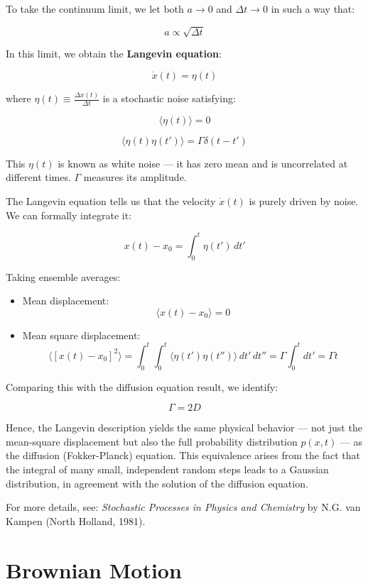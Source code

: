 \documentclass[
  letterpaper,
  enabledeprecatedfontcommands]{report}
\begin{document}
To take the continuum limit, we let both \(a \to 0\) and
\(\Delta t \to 0\) in such a way that:

\[
a \propto \sqrt{\Delta t}
\]

In this limit, we obtain the \textbf{Langevin equation}:

\[
\dot{x}(t) = \eta(t)
\]

where \(\eta(t)\equiv\frac{\Delta x(t)}{\Delta t}\) is a stochastic
noise satisfying:

\[
\langle \eta(t) \rangle = 0
\]

\[
\langle \eta(t) \eta(t') \rangle = \Gamma \delta(t - t')
\]

This \(\eta(t)\) is known as white noise --- it has zero mean and is
uncorrelated at different times. \(\Gamma\) measures its amplitude.

The Langevin equation tells us that the velocity \(\dot{x}(t)\) is
purely driven by noise. We can formally integrate it:

\[
x(t) - x_0 = \int_0^t \eta(t')\, dt'
\]

Taking ensemble averages:

\begin{itemize}
\item
  Mean displacement: \[
  \langle x(t) - x_0 \rangle = 0
  \]
\item
  Mean square displacement: \[
  \langle [x(t) - x_0]^2 \rangle = \int_0^t \int_0^t \langle \eta(t') \eta(t'') \rangle\, dt'\, dt'' = \Gamma \int_0^t dt' = \Gamma t
  \]
\end{itemize}

Comparing this with the diffusion equation result, we identify:

\[
\Gamma = 2D
\]

Hence, the Langevin description yields the same physical behavior ---
not just the mean-square displacement but also the full probability
distribution \(p(x, t)\) --- as the diffusion (Fokker-Planck) equation.
This equivalence arises from the fact that the integral of many small,
independent random steps leads to a Gaussian distribution, in agreement
with the solution of the diffusion equation.

For more details, see: \emph{Stochastic Processes in Physics and
Chemistry} by N.G. van Kampen (North Holland, 1981).

\section{Brownian Motion}\label{brownian-motion}
\end{document}

